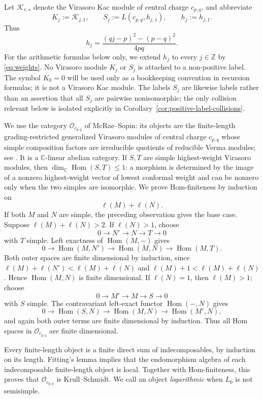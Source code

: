 \documentclass[12pt,leqno]{amsart}
\numberwithin{equation}{section}
\newcommand{\Hom}{\operatorname{Hom}}
\newcommand{\Oc}{\mathcal O}
\newcommand{\Kac}{\mathcal K}
\def\Z{\mathbb{Z}}
\def\C{\mathbb{C}}
\begin{document}
Let $\Kac_{r,s}$ denote the Virasoro Kac module of central charge
$c_{p,q}$, and abbreviate
\[
 K_j:=\Kac_{j,1},
 \qquad
 S_j:=L(c_{p,q},h_{j,1}),
 \qquad
 h_j:=h_{j,1}.
\]
Thus
\begin{equation}\label{eq:weights}
 h_j=\frac{(qj-p)^2-(p-q)^2}{4pq}.
\end{equation}
For the arithmetic formulas below only, we extend $h_j$ to every
$j\in\Z$ by \eqref{eq:weights}.  No Virasoro module $K_j$ or $S_j$ is
attached to a non-positive label.  The symbol $K_0=0$ will be used only as
a bookkeeping convention in recursion formulas; it is not a Virasoro Kac
module.  The labels $S_j$
are likewise labels rather than an assertion that all $S_j$ are pairwise
nonisomorphic; the only collision relevant below is isolated explicitly
in Corollary~\ref{cor:positive-label-collisions}.

We use the category $\Oc_{c_{p,q}}$ of McRae--Sopin: its objects are the
finite-length grading-restricted generalized Virasoro modules of central
charge $c_{p,q}$ whose simple composition factors are irreducible quotients
of reducible Verma modules; see \cite[Theorem~3.4]{McRaeSopin}.  It is a
$\C$-linear abelian category.  If $S,T$ are simple highest-weight Virasoro
modules, then $\dim_\C\Hom(S,T)\le1$: a morphism is determined by the image
of a nonzero highest-weight vector of lowest conformal weight and can be
nonzero only when the two simples are isomorphic.  We prove Hom-finiteness
by induction on
\[
 \ell(M)+\ell(N).
\]
If both $M$ and $N$ are simple, the preceding observation gives the base
case.  Suppose $\ell(M)+\ell(N)>2$.  If $\ell(N)>1$, choose
\[
 0\longrightarrow N'\longrightarrow N\longrightarrow T\longrightarrow0
\]
with $T$ simple.  Left exactness of $\Hom(M,-)$ gives
\[
 0\longrightarrow\Hom(M,N')\longrightarrow\Hom(M,N)
 \longrightarrow\Hom(M,T).
\]
Both outer spaces are finite dimensional by induction, since
$\ell(M)+\ell(N')<\ell(M)+\ell(N)$ and
$\ell(M)+1<\ell(M)+\ell(N)$.  Hence $\Hom(M,N)$ is finite dimensional.
If $\ell(N)=1$, then $\ell(M)>1$; choose
\[
 0\longrightarrow M'\longrightarrow M\longrightarrow S\longrightarrow0
\]
with $S$ simple.  The contravariant left-exact functor $\Hom(-,N)$ gives
\[
 0\longrightarrow\Hom(S,N)\longrightarrow\Hom(M,N)
 \longrightarrow\Hom(M',N),
\]
and again both outer terms are finite dimensional by induction.  Thus all
Hom spaces in $\Oc_{c_{p,q}}$ are finite dimensional.

Every finite-length object is a finite direct sum of indecomposables, by
induction on its length.  Fitting's lemma implies that the endomorphism
algebra of each indecomposable finite-length object is local.  Together
with Hom-finiteness, this proves that $\Oc_{c_{p,q}}$ is Krull--Schmidt.
We call an object \emph{logarithmic} when $L_0$ is not semisimple.
\end{document}
